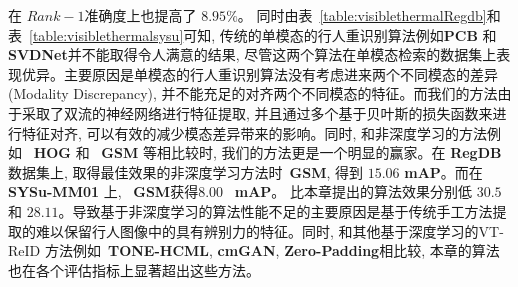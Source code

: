 在 $Rank-1$准确度上也提高了 $8.95 \%$。 同时由表~\ref{table:visiblethermalRegdb}和表~\ref{table:visiblethermalsysu}可知, 传统的单模态的行人重识别算法例如\textbf{PCB} 和 \textbf{SVDNet}并不能取得令人满意的结果, 尽管这两个算法在单模态检索的数据集上表现优异。主要原因是单模态的行人重识别算法没有考虑进来两个不同模态的差异 (Modality Discrepancy), 并不能充足的对齐两个不同模态的特征。而我们的方法由于采取了双流的神经网络进行特征提取, 并且通过多个基于贝叶斯的损失函数来进行特征对齐, 可以有效的减少模态差异带来的影响。同时, 和非深度学习的方法例如 ~\textbf{HOG} 和 ~\textbf{GSM} 等相比较时, 我们的方法更是一个明显的赢家。在 \textbf{RegDB}数据集上, 取得最佳效果的非深度学习方法时~\textbf{GSM}, 得到 $15.06$ \textbf{mAP}。而在 \textbf{SYSu-MM01} 上, ~\textbf{GSM}获得$8.00$ ~\textbf{mAP}。 比本章提出的算法效果分别低 $30.5$ 和 $28.11$。导致基于非深度学习的算法性能不足的主要原因是基于传统手工方法提取的难以保留行人图像中的具有辨别力的特征。同时, 和其他基于深度学习的VT-ReID 方法例如~\textbf{TONE-HCML}, \textbf{cmGAN}, \textbf{Zero-Padding}相比较, 本章的算法也在各个评估指标上显著超出这些方法。

